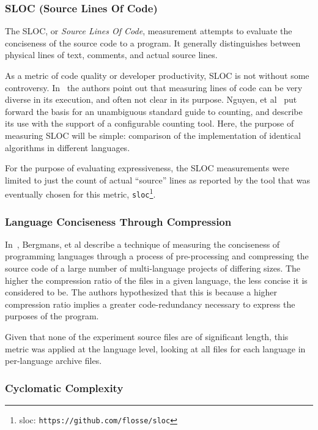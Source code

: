\subsubsection{SLOC (Source Lines Of Code)}

The SLOC, or \textit{Source Lines Of Code}, measurement attempts to evaluate the conciseness of the source code to a program. It generally distinguishes between physical lines of text, comments, and actual source lines.

As a metric of code quality or developer productivity, SLOC is not without some controversy. In~\cite{alpernas.2020} the authors point out that measuring lines of code can be very diverse in its execution, and often not clear in its purpose. Nguyen, et al~\cite{nguyen.2007} put forward the basis for an unambiguous standard guide to counting, and describe its use with the support of a configurable counting tool. Here, the purpose of measuring SLOC will be simple: comparison of the implementation of identical algorithms in different languages.

For the purpose of evaluating expressiveness, the SLOC measurements were limited to just the count of actual ``source'' lines as reported by the tool that was eventually chosen for this metric, \texttt{sloc}\footnote{sloc: \texttt{https://github.com/flosse/sloc}}.

\subsubsection{Language Conciseness Through Compression}

In~\cite{bergmans.et.al.2021}, Bergmans, et al describe a technique of measuring the conciseness of programming languages through a process of pre-processing and compressing the source code of a large number of multi-language projects of differing sizes. The higher the compression ratio of the files in a given language, the less concise it is considered to be. The authors hypothesized that this is because a higher compression ratio implies a greater code-redundancy necessary to express the purposes of the program.

Given that none of the experiment source files are of significant length, this metric was applied at the language level, looking at all files for each language in per-language archive files.

\subsubsection{Cyclomatic Complexity}

